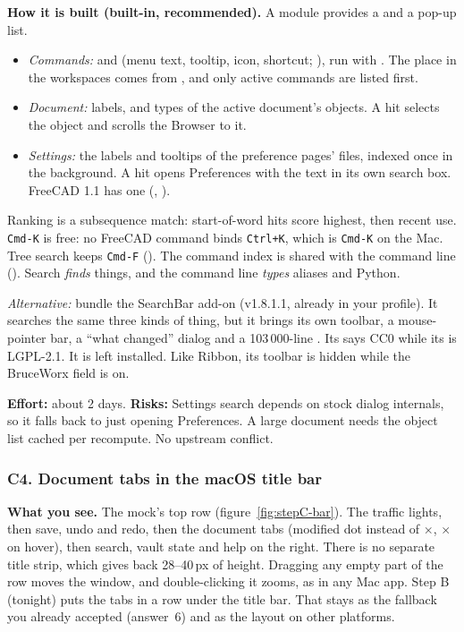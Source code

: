 \textbf{How it is built (built-in, recommended).} A module  provides a
 and a pop-up list.
\begin{itemize}[nosep]
  \item \emph{Commands:}  and  (menu text, tooltip, icon, shortcut;
        ), run with . The place in the workspaces comes from
        , and only active commands are listed first.
  \item \emph{Document:} labels,  and types of the active document's objects. A hit selects the
        object and scrolls the Browser to it.
  \item \emph{Settings:} the labels and tooltips of the preference pages'  files, indexed once in the
        background. A hit opens Preferences with the text in its own search box. FreeCAD 1.1 has one
        (, ).
\end{itemize}
Ranking is a subsequence match: start-of-word hits score highest, then recent use. \texttt{Cmd-K} is free: no
FreeCAD command binds \texttt{Ctrl+K}, which is \texttt{Cmd-K} on the Mac. Tree search keeps \texttt{Cmd-F}
(). The command index is shared with the command line (). Search \emph{finds}
things, and the command line \emph{types} aliases and Python.

\emph{Alternative:} bundle the SearchBar add-on (v1.8.1.1, already in your profile). It searches the same three
kinds of thing, but it brings its own toolbar, a mouse-pointer bar, a ``what changed'' dialog and a
103\,000-line . Its  says CC0 while its  is LGPL-2.1. It is
left installed. Like Ribbon, its toolbar is hidden while the BruceWorx field is on.

\textbf{Effort:} about 2 days. \textbf{Risks:} Settings search depends on stock dialog internals, so it falls
back to just opening Preferences. A large document needs the object list cached per recompute. No upstream
conflict.

\subsubsection*{C4. Document tabs in the macOS title bar}

\textbf{What you see.} The mock's top row (figure~\ref{fig:stepC-bar}). The traffic lights, then save, undo and
redo, then the document tabs (modified dot instead of $\times$, $\times$ on hover), then search, vault state and
help on the right. There is no separate title strip, which gives back 28--40\,px of height. Dragging any empty
part of the row moves the window, and double-clicking it zooms, as in any Mac app. Step B (tonight) puts the tabs
in a row under the title bar. That stays as the fallback you already accepted (answer~6) and as the layout on
other platforms.

